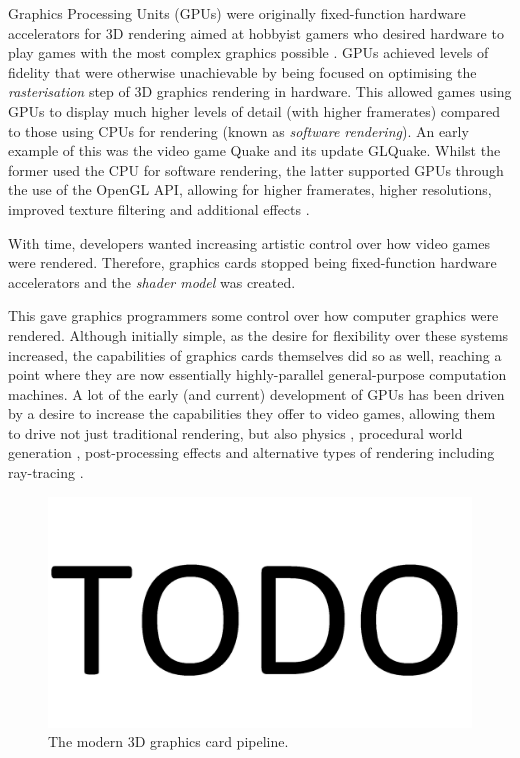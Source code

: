\documentclass[a4paper,12pt,twoside,openright]{report}
\begin{document}
Graphics Processing Units (GPUs) were originally fixed-function hardware
accelerators for 3D rendering aimed at hobbyist gamers who desired hardware to
play games with the most complex graphics possible \cite{TODO}. GPUs achieved
levels of fidelity that were otherwise unachievable by being focused on
optimising the \textit{rasterisation} step of 3D graphics rendering in
hardware. This allowed games using GPUs to display much higher levels of detail
(with higher framerates) compared to those using CPUs for rendering (known as
\textit{software rendering}). An early example of this was the video game Quake
and its update GLQuake. Whilst the former used the CPU for software rendering,
the latter supported GPUs through the use of the OpenGL API, allowing for
higher framerates, higher resolutions, improved texture filtering and
additional effects \cite{GLQuake}.

With time, developers wanted increasing artistic control over how video games
were rendered. Therefore, graphics cards stopped being fixed-function hardware
accelerators and the \textit{shader model} was created.

This gave graphics programmers some control over how computer graphics were
rendered. Although initially simple, as the desire for flexibility over these
systems increased, the capabilities of graphics cards themselves did so as
well, reaching a point where they are now essentially highly-parallel
general-purpose computation machines. A lot of the early (and current)
development of GPUs has been driven by a desire to increase the capabilities
they offer to video games, allowing them to drive not just traditional
rendering, but also physics \cite{TODO}, procedural world generation
\cite{TODO}, post-processing effects \cite{TODO} and alternative types of
rendering including ray-tracing \cite{TODO}.

\begin{figure}[h]
\centering
\includegraphics[width=0.8\linewidth]{TODO}
\caption{The modern 3D graphics card pipeline.}
\label{fig:graphics_pipeline}
\end{figure}
\end{document}
